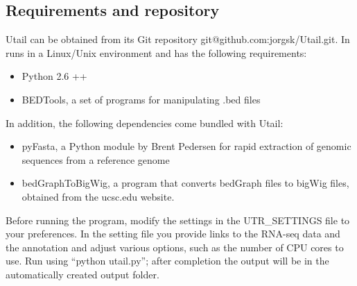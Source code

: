 \subsection{Requirements and repository}
Utail can be obtained from its Git repository git@github.com:jorgsk/Utail.git.
In runs in a Linux/Unix environment and has the following requirements:
\begin{itemize}
	\item Python 2.6 ++
	\item BEDTools, a set of programs for manipulating .bed files
		\cite{quinlan_bedtools:_2010}
\end{itemize}
In addition, the following dependencies come bundled with Utail:
\begin{itemize}
	\item pyFasta, a Python module by Brent Pedersen for rapid extraction of
		genomic sequences from a reference genome
	\item bedGraphToBigWig, a program that converts bedGraph files to bigWig
		files, obtained from the ucsc.edu website.
\end{itemize}
Before running the program, modify the settings in the UTR\_SETTINGS file to
your preferences. In the setting file you provide links to the RNA-seq data and
the annotation and adjust various options, such as the number of CPU cores to
use. Run using ``python utail.py''; after completion the output will be in the
automatically created output folder.
